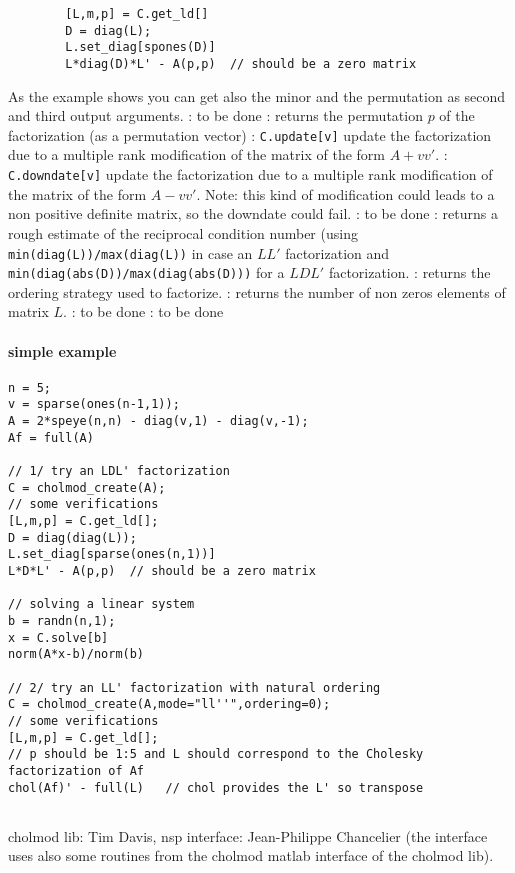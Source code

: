 \begin{varlist}
\begin{Verbatim}
        [L,m,p] = C.get_ld[]
        D = diag(L);
        L.set_diag[spones(D)]
        L*diag(D)*L' - A(p,p)  // should be a zero matrix 
        \end{Verbatim}
        As the example shows you can get also the minor and the permutation as second and third
        output arguments.
  : to be done       
  : returns the permutation $p$ of the factorization (as a permutation vector)         
  : \verb+C.update[v]+ update the factorization due to a multiple rank modification
        of the matrix of the form $A + vv'$.          
  : \verb+C.downdate[v]+ update the factorization due to a multiple rank modification
        of the matrix of the form $A - vv'$. Note: this kind of modification could leads to a non
        positive definite matrix, so the downdate could fail.             
  : to be done          
  : returns a rough estimate of the reciprocal condition number (using 
        \verb+min(diag(L))/max(diag(L))+ in case an $LL'$ factorization and 
        \verb+min(diag(abs(D))/max(diag(abs(D)))+ for a $LDL'$ factorization.
  : returns the ordering strategy used to factorize.      
  : returns the number of non zeros elements of matrix $L$.        
  : to be done            
  : to be done         
\end{varlist}

\begin{examples}
\paragraph{simple example}
  \begin{Verbatim}
n = 5;
v = sparse(ones(n-1,1));
A = 2*speye(n,n) - diag(v,1) - diag(v,-1);
Af = full(A)

// 1/ try an LDL' factorization
C = cholmod_create(A);
// some verifications
[L,m,p] = C.get_ld[];
D = diag(diag(L));
L.set_diag[sparse(ones(n,1))]
L*D*L' - A(p,p)  // should be a zero matrix 

// solving a linear system
b = randn(n,1);
x = C.solve[b]
norm(A*x-b)/norm(b)

// 2/ try an LL' factorization with natural ordering
C = cholmod_create(A,mode="ll''",ordering=0);
// some verifications
[L,m,p] = C.get_ld[];
// p should be 1:5 and L should correspond to the Cholesky factorization of Af
chol(Af)' - full(L)   // chol provides the L' so transpose


  \end{Verbatim}
 \end{examples}

\begin{authors}
   cholmod lib: Tim Davis, nsp interface: Jean-Philippe Chancelier (the interface uses also
   some routines from the cholmod matlab interface of the cholmod lib).
\end{authors}
